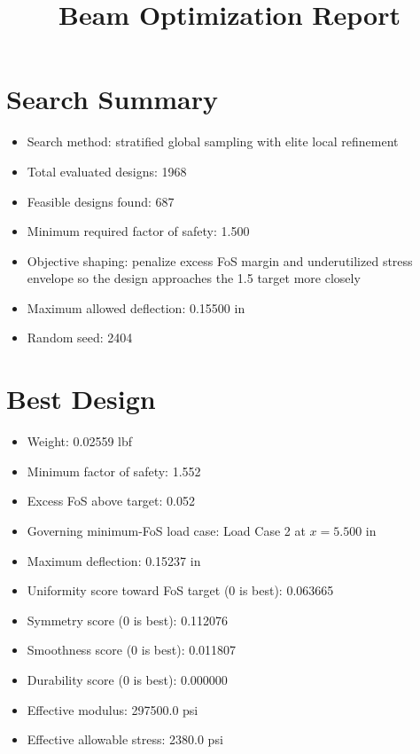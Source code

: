 \documentclass[11pt]{article}
\title{Beam Optimization Report}
\date{}
\begin{document}
\maketitle

\section*{Search Summary}
\begin{itemize}
\item Search method: stratified global sampling with elite local refinement
\item Total evaluated designs: 1968
\item Feasible designs found: 687
\item Minimum required factor of safety: 1.500
\item Objective shaping: penalize excess FoS margin and underutilized stress envelope so the design approaches the 1.5 target more closely
\item Maximum allowed deflection: 0.15500 in
\item Random seed: 2404
\end{itemize}

\section*{Best Design}
\begin{itemize}
\item Weight: 0.02559 lbf
\item Minimum factor of safety: 1.552
\item Excess FoS above target: 0.052
\item Governing minimum-FoS load case: Load Case 2 at $x=5.500$ in
\item Maximum deflection: 0.15237 in
\item Uniformity score toward FoS target (0 is best): 0.063665
\item Symmetry score (0 is best): 0.112076
\item Smoothness score (0 is best): 0.011807
\item Durability score (0 is best): 0.000000
\item Effective modulus: 297500.0 psi
\item Effective allowable stress: 2380.0 psi
\end{itemize}
\end{document}
